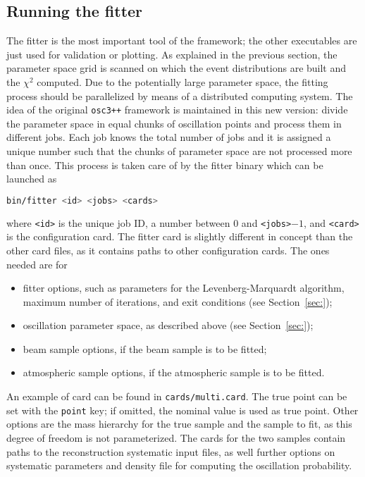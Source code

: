 \documentclass[a4paper, 11pt]{article}
\newcommand{\refsec}[1]{Section~\ref{#1}}
\begin{document}
\subsection{Running the fitter}

The fitter is the most important tool of the framework; %
the other executables are just used for validation or plotting.
As explained in the previous section, the parameter space grid is scanned on which the event %
distributions are built and the $\chi^2$ computed.
Due to the potentially large parameter space, the fitting process should be parallelized %
by means of a distributed computing system.
The idea of the original \texttt{osc3++} framework is maintained in this new version: %
divide the parameter space in equal chunks of oscillation points and process them in %
different jobs.
Each job knows the total number of jobs and it is assigned a unique number such that %
the chunks of parameter space are not processed more than once.
This process is taken care of by the fitter binary which can be launched as
\begin{lstlisting}[language=bash]
    bin/fitter <id> <jobs> <cards>
\end{lstlisting}
where \texttt{<id>} is the unique job ID, a number between 0 and \texttt{<jobs>}$-1$, and %
\texttt{<card>} is the configuration card.
The fitter card is slightly different in concept than the other card files, as it contains %
paths to other configuration cards.
The ones needed are for
\begin{itemize}
	\item fitter options, such as parameters for the Levenberg-Marquardt algorithm, %
		maximum number of iterations, and exit conditions (see \refsec{sec:});
	\item oscillation parameter space, as described above (see \refsec{sec:});
	\item beam sample options, if the beam sample is to be fitted;
	\item atmospheric sample options, if the atmospheric sample is to be fitted.
\end{itemize}
An example of card can be found in \texttt{cards/multi.card}.
The true point can be set with the \texttt{point} key; if omitted, the nominal value is used %
as true point.
Other options are the mass hierarchy for the true sample and the sample to fit, %
as this degree of freedom is not parameterized.
The cards for the two samples contain paths to the reconstruction systematic input files, %
as well further options on systematic parameters and density file for computing the %
oscillation probability.
\end{document}
